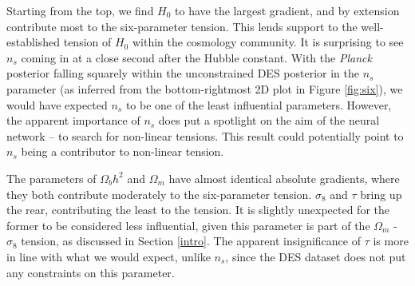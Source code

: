 \documentclass[%
 reprint,
 amsmath,amssymb,
 aps,
]{revtex4-2}
\begin{document}
Starting from the top, we find $H_0$ to have the largest gradient, and by extension contribute most to the six-parameter tension. This lends support to the well-established tension of $H_0$ within the cosmology community. It is surprising to see $n_s$ coming in at a close second after the Hubble constant. With the \textit{Planck} posterior falling squarely within the unconstrained DES posterior in the $n_s$ parameter (as inferred from the bottom-rightmost 2D plot in Figure \ref{fig:six}), we would have expected $n_s$ to be one of the least influential parameters. However, the apparent importance of $n_s$ does put a spotlight on the aim of the neural network -- to search for non-linear tensions. This result could potentially point to $n_s$ being a contributor to non-linear tension. 

The parameters of $\Omega_b h^2$ and $\Omega_m$ have almost identical absolute gradients, where they both contribute moderately to the six-parameter tension. $\sigma_8$ and $\tau$ bring up the rear, contributing the least to the tension. It is slightly unexpected for the former to be considered less influential, given this parameter is part of the $\Omega_m$ - $\sigma_8$ tension, as discussed in Section \ref{intro}. The apparent insignificance of $\tau$ is more in line with what we would expect, unlike $n_s$, since the DES dataset does not put any constraints on this parameter. 




\end{document}
